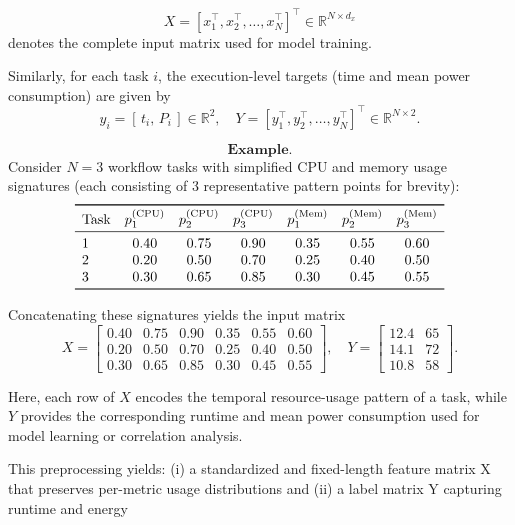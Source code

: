 \[
    X =
    [x_1^\top, x_2^\top, \dots, x_N^\top]^\top
    \in \mathbb{R}^{N \times d_x}
\]
denotes the complete input matrix used for model training.

Similarly, for each task \( i \), the execution-level targets
(time and mean power consumption) are given by
\[
    y_i = [\,t_i,\, P_i\,] \in \mathbb{R}^2,
    \quad
    Y = [y_1^\top, y_2^\top, \dots, y_N^\top]^\top
    \in \mathbb{R}^{N \times 2}.
\]

\[
    \textbf{Example.}
\]
Consider \( N = 3 \) workflow tasks with simplified
CPU and memory usage signatures
(each consisting of 3 representative pattern points for brevity):
\[
    \begin{array}{lcccccc}
        \toprule
        \text{Task}        &
        p_1^{(\text{CPU})} & p_2^{(\text{CPU})} & p_3^{(\text{CPU})} &
        p_1^{(\text{Mem})} & p_2^{(\text{Mem})} & p_3^{(\text{Mem})}                             \\
        \midrule
        1                  & 0.40               & 0.75               & 0.90 & 0.35 & 0.55 & 0.60 \\
        2                  & 0.20               & 0.50               & 0.70 & 0.25 & 0.40 & 0.50 \\
        3                  & 0.30               & 0.65               & 0.85 & 0.30 & 0.45 & 0.55 \\
        \bottomrule
    \end{array}
\]

Concatenating these signatures yields the input matrix
\[
    X =
    \begin{bmatrix}
        0.40 & 0.75 & 0.90 & 0.35 & 0.55 & 0.60 \\
        0.20 & 0.50 & 0.70 & 0.25 & 0.40 & 0.50 \\
        0.30 & 0.65 & 0.85 & 0.30 & 0.45 & 0.55
    \end{bmatrix},
    \quad
    Y =
    \begin{bmatrix}
        12.4 & 65 \\
        14.1 & 72 \\
        10.8 & 58
    \end{bmatrix}.
\]

Here, each row of \( X \) encodes the temporal resource-usage pattern
of a task, while \( Y \) provides the corresponding runtime and mean
power consumption used for model learning or correlation analysis.

This preprocessing yields: (i) a standardized and fixed-length feature matrix X that preserves per-metric usage distributions and (ii) a label matrix Y capturing runtime and energy

